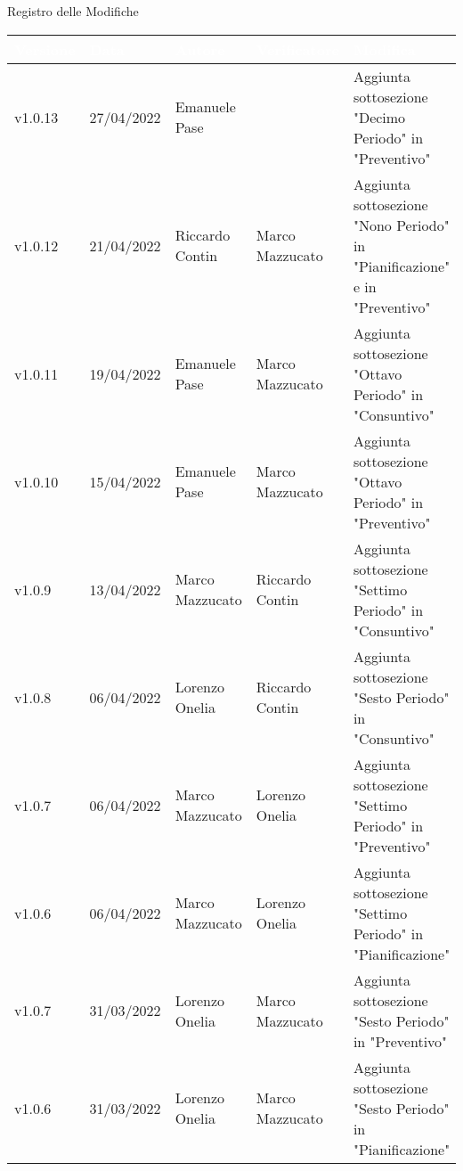\begin{center}
  \huge{Registro delle Modifiche}
\end{center}
\renewcommand\arraystretch{1,5}
{\centering
\begin{longtable}{|C{1.8cm}|C{2.1cm}|C{2cm}|C{2.4cm}|L{4.4cm}|}
  \hline
  \textcolor[HTML]{FFFFFF}{\textbf{Versione}} & \textcolor[HTML]{FFFFFF}{\textbf{Data}} & \textcolor[HTML]{FFFFFF}{\textbf{Autore}}  & \textcolor[HTML]{FFFFFF}{\textbf{Verificatore}} & \textcolor[HTML]{FFFFFF}{\textbf{Modifica}}    \\ \hline
  v1.0.13       & 27/04/2022    & Emanuele Pase   &                     & Aggiunta sottosezione "Decimo Periodo" in "Preventivo" \\ \hline
  v1.0.12       & 21/04/2022    & Riccardo Contin   &  Marco Mazzucato   & Aggiunta sottosezione "Nono Periodo" in "Pianificazione" e in "Preventivo" \\ \hline
  v1.0.11       & 19/04/2022    & Emanuele Pase   &  Marco Mazzucato   & Aggiunta sottosezione "Ottavo Periodo" in "Consuntivo" \\ \hline
  v1.0.10       & 15/04/2022    & Emanuele Pase   &  Marco Mazzucato   & Aggiunta sottosezione "Ottavo Periodo" in "Preventivo" \\ \hline
  v1.0.9        & 13/04/2022    & Marco Mazzucato   &  Riccardo Contin   & Aggiunta sottosezione "Settimo Periodo" in "Consuntivo" \\ \hline
  v1.0.8        & 06/04/2022    & Lorenzo Onelia   &  Riccardo Contin    & Aggiunta sottosezione "Sesto Periodo" in "Consuntivo" \\ \hline
  v1.0.7        & 06/04/2022    & Marco Mazzucato   &   Lorenzo Onelia   & Aggiunta sottosezione "Settimo Periodo" in "Preventivo" \\ \hline
  v1.0.6        & 06/04/2022    & Marco Mazzucato   &  Lorenzo Onelia    & Aggiunta sottosezione "Settimo Periodo" in "Pianificazione" \\ \hline
  v1.0.7        & 31/03/2022    & Lorenzo Onelia   &  Marco Mazzucato    & Aggiunta sottosezione "Sesto Periodo" in "Preventivo" \\ \hline
  v1.0.6        & 31/03/2022    & Lorenzo Onelia   &   Marco Mazzucato   & Aggiunta sottosezione "Sesto Periodo" in "Pianificazione" \\ \hline

\end{longtable}}
